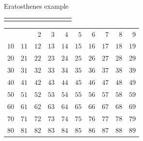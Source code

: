 \documentclass{beamer}
\begin{document}
\begin{frame}[plain]{Eratosthenes example}
{\begin{tabular}{r r r r r r r r r r}
			\phantom{$888$} & \phantom{$888$} & \phantom{$888$} & \phantom{$888$} & \phantom{$888$} & \phantom{$888$} & \phantom{$888$} & \phantom{$888$} & \phantom{$888$} & \phantom{$888$}
        \end{tabular}
    }
	 {
		\begin{tabular}{r r r r r r r r r r}
			                   &                    & \color{black}  $2$ & \color{black}  $3$ & \color{black}  $4$ & \color{black}  $5$ & \color{black}  $6$ & \color{black}  $7$ & \color{black}  $8$ & \color{black}  $9$\\
			\color{black} $10$ & \color{black} $11$ & \color{black} $12$ & \color{black} $13$ & \color{black} $14$ & \color{black} $15$ & \color{black} $16$ & \color{black} $17$ & \color{black} $18$ & \color{black} $19$\\
			\color{black} $20$ & \color{black} $21$ & \color{black} $22$ & \color{black} $23$ & \color{black} $24$ & \color{black} $25$ & \color{black} $26$ & \color{black} $27$ & \color{black} $28$ & \color{black} $29$\\
			\color{black} $30$ & \color{black} $31$ & \color{black} $32$ & \color{black} $33$ & \color{black} $34$ & \color{black} $35$ & \color{black} $36$ & \color{black} $37$ & \color{black} $38$ & \color{black} $39$\\
			\color{black} $40$ & \color{black} $41$ & \color{black} $42$ & \color{black} $43$ & \color{black} $44$ & \color{black} $45$ & \color{black} $46$ & \color{black} $47$ & \color{black} $48$ & \color{black} $49$\\
			\color{black} $50$ & \color{black} $51$ & \color{black} $52$ & \color{black} $53$ & \color{black} $54$ & \color{black} $55$ & \color{black} $56$ & \color{black} $57$ & \color{black} $58$ & \color{black} $59$\\
			\color{black} $60$ & \color{black} $61$ & \color{black} $62$ & \color{black} $63$ & \color{black} $64$ & \color{black} $65$ & \color{black} $66$ & \color{black} $67$ & \color{black} $68$ & \color{black} $69$\\
			\color{black} $70$ & \color{black} $71$ & \color{black} $72$ & \color{black} $73$ & \color{black} $74$ & \color{black} $75$ & \color{black} $76$ & \color{black} $77$ & \color{black} $78$ & \color{black} $79$\\
			\color{black} $80$ & \color{black} $81$ & \color{black} $82$ & \color{black} $83$ & \color{black} $84$ & \color{black} $85$ & \color{black} $86$ & \color{black} $87$ & \color{black} $88$ & \color{black} $89$\\

\end{tabular}}
\end{frame}
\end{document}
